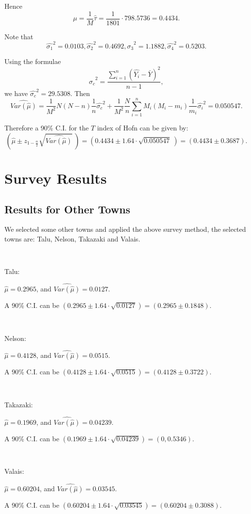 \documentclass[12pt]{article}%
\begin{document}
Hence $$\hat{\mu}=\frac{1}{M}\hat{\tau}=\frac{1}{1801}\cdot 798.5736=0.4434.$$

Note that 
$$
\hat{\sigma_1}^2=0.0103, 
\hat{\sigma_2}^2=0.4692,
\hat{\sigma_3}^2=1.1882, 
\hat{\sigma_4}^2=0.5203.
$$

Using the formulae 
$$\hat{\sigma_c}^2=\frac{ \sum_{i=1}^n (\hat{Y_i} - \bar{Y})^2 }{n-1},$$
we have $\hat{\sigma_c}^2 = 29.5308.$ Then 
$$\widehat{Var(\hat{\mu})} 
= \frac{1}{M^2}N(N-n)\frac{1}{n}\hat{\sigma_c}^2
+\frac{1}{M^2}\frac{N}{n}\sum_{i=1}^{n}M_i(M_i-m_i)\frac{1}{m_i}\hat{\sigma_i}^2
=0.050547.$$

Therefore a 90\% C.I. for the $T$ index of Hofn can be given by: 
$$(\hat{\mu} \pm z_{1-\frac{\alpha}{2}}\sqrt{\widehat{Var(\hat{\mu})}}~)
=(0.4434 \pm 1.64\cdot \sqrt{0.050547}~)
=(0.4434 \pm 0.3687).$$

\section{Survey Results}
\subsection{Results for Other Towns}
We selected some other towns and applied the above survey method, 
the selected towns are: Talu, Nelson, Takazaki and Valais.

~\ 

Talu: 

$\hat{\mu}=0.2965$, 
and $\widehat{Var(\hat{\mu})}=0.0127.$ 

A 90\% C.I. can be $(0.2965 \pm 1.64\cdot \sqrt{0.0127} )=(0.2965 \pm 0.1848)$.

~\ 

Nelson: 

$\hat{\mu}=0.4128$, 
and $\widehat{Var(\hat{\mu})}=0.0515.$ 

A 90\% C.I. can be $(0.4128 \pm 1.64\cdot \sqrt{0.0515} )=(0.4128 \pm 0.3722)$.

~\ 

Takazaki: 

$\hat{\mu}=0.1969$, 
and $\widehat{Var(\hat{\mu})}=0.04239.$ 

A 90\% C.I. can be $(0.1969 \pm 1.64\cdot \sqrt{0.04239} )
=(0, 0.5346)$.

~\ 

Valais: 

$\hat{\mu}=0.60204$, 
and $\widehat{Var(\hat{\mu})}=0.03545.$ 

A 90\% C.I. can be $(0.60204 \pm 1.64\cdot \sqrt{0.03545} )
=(0.60204 \pm 0.3088)$.
\end{document}
